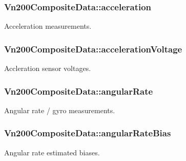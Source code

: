 \subsubsection[{\texorpdfstring{acceleration}{acceleration}}]{ Vn200\+Composite\+Data\+::acceleration}\hypertarget{structVn200CompositeData_ada4e8832ecf9ad1647a3133bf7fb4923}{}\label{structVn200CompositeData_ada4e8832ecf9ad1647a3133bf7fb4923}
Acceleration measurements. 
\subsubsection[{\texorpdfstring{acceleration\+Voltage}{accelerationVoltage}}]{ Vn200\+Composite\+Data\+::acceleration\+Voltage}\hypertarget{structVn200CompositeData_aae168546f0864e2d2d165b622152aa4e}{}\label{structVn200CompositeData_aae168546f0864e2d2d165b622152aa4e}
Accleration sensor voltages. 
\subsubsection[{\texorpdfstring{angular\+Rate}{angularRate}}]{ Vn200\+Composite\+Data\+::angular\+Rate}\hypertarget{structVn200CompositeData_ad680afd12756b680b8363ed53514ea98}{}\label{structVn200CompositeData_ad680afd12756b680b8363ed53514ea98}
Angular rate / gyro measurements. 
\subsubsection[{\texorpdfstring{angular\+Rate\+Bias}{angularRateBias}}]{ Vn200\+Composite\+Data\+::angular\+Rate\+Bias}\hypertarget{structVn200CompositeData_a780c63b13f748a7833a715c25cdd27b6}{}\label{structVn200CompositeData_a780c63b13f748a7833a715c25cdd27b6}
Angular rate estimated biases. 
